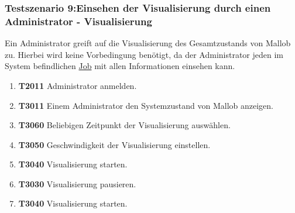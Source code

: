\subsubsection{Testszenario 9:Einsehen der Visualisierung durch einen Administrator - Visualisierung}
Ein \gls{Administrator} greift auf die Visualisierung des Gesamtzustands von Mallob zu. Hierbei wird keine Vorbedingung benötigt, da der \gls{Administrator} jeden im System befindlichen \hyperref[B:Jobs]{Job} mit allen Informationen einsehen kann.

\begin{enumerate}
    \item \textbf{T2011} \gls{Administrator} anmelden.
    
    \item \textbf{T3011} Einem \gls{Administrator} den Systemzustand von Mallob anzeigen.
    
    \item \textbf{T3060} Beliebigen Zeitpunkt der Visualisierung auswählen.
    
    \item \textbf{T3050} Geschwindigkeit der Visualisierung einstellen.
    
    \item \textbf{T3040} Visualisierung starten. 
    
    \item \textbf{T3030} Visualisierung pausieren.

    \item \textbf{T3040} Visualisierung starten.
\end{enumerate}



	